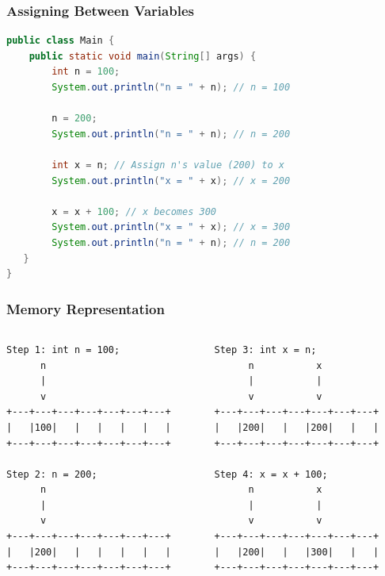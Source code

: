 \documentclass[serif, aspectratio=169]{beamer}
\begin{document}
\begin{frame}[fragile]
\frametitle{Assigning Between Variables}
\begin{lstlisting}[language=Java]
public class Main {
    public static void main(String[] args) {
        int n = 100;
        System.out.println("n = " + n); // n = 100

        n = 200;
        System.out.println("n = " + n); // n = 200

        int x = n; // Assign n's value (200) to x
        System.out.println("x = " + x); // x = 200

        x = x + 100; // x becomes 300
        System.out.println("x = " + x); // x = 300
        System.out.println("n = " + n); // n = 200
   }
}
\end{lstlisting}
\end{frame}

\begin{frame}[fragile]
\frametitle{Memory Representation}
    \vspace{-1.8em}
    \begin{columns}
    \begin{column}{0.5\textwidth}
\begin{verbatim}
Step 1: int n = 100;
      n
      |
      v
+---+---+---+---+---+---+---+
|   |100|   |   |   |   |   |
+---+---+---+---+---+---+---+

Step 2: n = 200;
      n
      |
      v
+---+---+---+---+---+---+---+
|   |200|   |   |   |   |   |
+---+---+---+---+---+---+---+
\end{verbatim}

    \end{column}
    \begin{column}{0.5\textwidth}
\begin{verbatim}
Step 3: int x = n;
      n           x
      |           |
      v           v
+---+---+---+---+---+---+---+
|   |200|   |   |200|   |   |
+---+---+---+---+---+---+---+

Step 4: x = x + 100;
      n           x
      |           |
      v           v
+---+---+---+---+---+---+---+
|   |200|   |   |300|   |   |
+---+---+---+---+---+---+---+
\end{verbatim}
    \end{column}
    \end{columns}
\end{frame}
\end{document}
